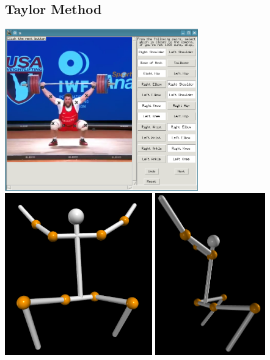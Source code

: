 \documentclass[final]{article}
\begin{document}
\begin{spacing}{1.1}
\subsection{Taylor Method}
\begin{center}
  \includegraphics[height=7cm]{fig/jerk.png}
  \includegraphics[height=7cm]{fig/jerkrecons.png}
  \includegraphics[height=7cm]{fig/jerkrecons2.png}
\end{center}


\end{spacing}
\end{document}
